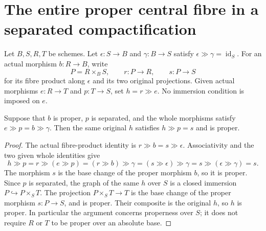 \section{The entire proper central fibre in a separated compactification}

Let $B,S,R,T$ be schemes. Let $\epsilon:S\to B$ and
$\gamma:B\to S$ satisfy $\epsilon\gg\gamma=\operatorname{id}_S$.
For an actual morphism $b:R\to B$, write
\[
 P=R\times_B S,\qquad r:P\to R,\qquad s:P\to S
\]
for its fibre product along $\epsilon$ and its two original projections.
Given actual morphisms $e:R\to T$ and $p:T\to S$, set
$h=r\gg e$. No immersion condition is imposed on $e$.

\begin{lemma}
\label{lem:proper-central-fiber-original-map}
\leanok
Suppose that $b$ is proper, $p$ is separated, and the whole morphisms
satisfy $e\gg p=b\gg\gamma$. Then the same original $h$ satisfies
$h\gg p=s$ and is proper.
\end{lemma}
\begin{proof}
The actual fibre-product identity is $r\gg b=s\gg\epsilon$.
Associativity and the two given whole identities give
\[
 h\gg p
 =r\gg(e\gg p)
 =(r\gg b)\gg\gamma
 =(s\gg\epsilon)\gg\gamma
 =s\gg(\epsilon\gg\gamma)=s.
\]
The morphism $s$ is the base change of the proper morphism $b$, so it
is proper. Since $p$ is separated, the graph of the same $h$ over $S$
is a closed immersion $P\hookrightarrow P\times_S T$. The projection
$P\times_S T\to T$ is the base change of the proper morphism
$s:P\to S$, and is proper. Their composite is the original $h$, so
$h$ is proper. In particular the argument concerns properness over
$S$; it does not require $R$ or $T$ to be proper over an absolute base.
\end{proof}

